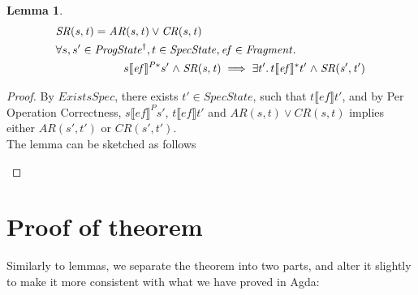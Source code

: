 \documentclass[letterpaper,twocolumn,10pt]{article}
\theoremstyle{definition}
\newtheorem{lemma}[theorem]{Lemma}
\newcommand{\conj}{\mathrel\land}
\renewcommand{\i}[1]{\ensuremath{\mathit{#1}}}
\begin{document}
\begin{lemma}\label{lemma-1}
	\begin{align*}
		&\i{SR(s, t)} = \i{AR(s, t)} \lor \i{CR(s, t)}\\
		&\forall s, s' \in \i{ProgState^\dagger}, t \in \i{SpecState}, \i{ef} \in \i{Fragment} \ldotp\\
		&\qquad \qquad \qquad s \llbracket \i{ef} \rrbracket^{P*} s'  \conj \i{SR(s, t)} \implies \exists t' \ldotp t\llbracket \i{ef} \rrbracket^* t' \conj \i{SR(s', t')} \\
	\end{align*}
\end{lemma}
\begin{proof}
	By $\i{ExistsSpec}$, there exists $t' \in SpecState$, such that $t \llbracket \i{ef} \rrbracket t'$, and by Per Operation Correctness, $s \llbracket \i{ef} \rrbracket^P s'$, $t \llbracket \i{ef} \rrbracket t'$ and $\i{AR(s, t)} \lor \i{CR(s, t)}$ implies either $\i{AR(s', t')}$ or $\i{CR(s', t')}$. \\
	The lemma can be sketched as follows
	\begin{figure} [h] \centering
{}
	\end{figure}
\end{proof}

\section{Proof of theorem}

Similarly to lemmas, we separate the theorem into two parts, and alter it slightly to make it more consistent with what we have proved in Agda:
\end{document}
